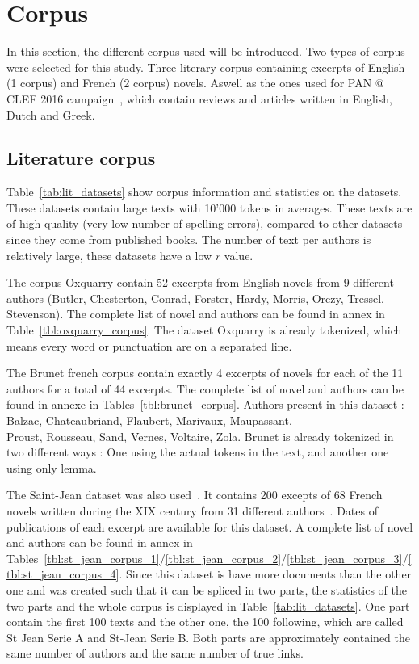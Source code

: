 \section{Corpus \label{sec:corpus}}

In this section, the different corpus used will be introduced.
Two types of corpus were selected for this study.
Three literary corpus containing excerpts of English (1 corpus) and French (2 corpus) novels.
Aswell as the ones used for PAN @ CLEF 2016 campaign~\cite{pan16}, which contain reviews and articles written in English, Dutch and Greek.

\subsection{Literature corpus}
\label{sec:lit_corpus}

Table~\ref{tab:lit_datasets} show corpus information and statistics on the datasets.
These datasets contain large texts with 10'000 tokens in averages.
These texts are of high quality (very low number of spelling errors), compared to other datasets since they come from published books.
The number of text per authors is relatively large, these datasets have a low $r$ value.

The corpus Oxquarry contain 52 excerpts from English novels from 9 different authors (Butler, Chesterton, Conrad, Forster, Hardy, Morris, Orczy, Tressel, Stevenson).
The complete list of novel and authors can be found in annex in Table~\ref{tbl:oxquarry_corpus}.
The dataset Oxquarry is already tokenized, which means every word or punctuation are on a separated line.

The Brunet french corpus contain exactly 4 excerpts of novels for each of the 11 authors for a total of 44 excerpts.
The complete list of novel and authors can be found in annexe in Tables~\ref{tbl:brunet_corpus}.
Authors present in this dataset : Balzac, Chateaubriand, Flaubert, Marivaux, Maupassant, \\
Proust, Rousseau, Sand, Vernes, Voltaire, Zola.
Brunet is already tokenized in two different ways : One using the actual tokens in the text, and another one using only lemma.

The Saint-Jean dataset was also used~\cite{unine_corpus}.
It contains 200 excepts of 68 French novels written during the XIX century from 31 different authors~\cite{st_jean}.
Dates of publications of each excerpt are available for this dataset.
A complete list of novel and authors can be found in annex in Tables~\ref{tbl:st_jean_corpus_1}/\ref{tbl:st_jean_corpus_2}/\ref{tbl:st_jean_corpus_3}/\ref{tbl:st_jean_corpus_4}.
Since this dataset is have more documents than the other one and was created such that it can be spliced in two parts, the statistics of the two parts and the whole corpus is displayed in Table~\ref{tab:lit_datasets}.
One part contain the first 100 texts and the other one, the 100 following, which are called St Jean Serie A and St-Jean Serie B.
Both parts are approximately contained the same number of authors and the same number of true links.

